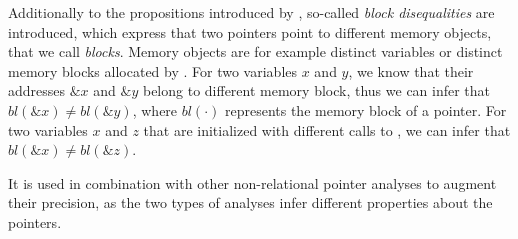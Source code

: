 Additionally to the propositions introduced by \textcite{2pointer}, so-called \emph{block disequalities}
are introduced, which express that two pointers point to different memory objects, that we call \emph{blocks}.
Memory objects are for example distinct variables or distinct memory blocks allocated by \malloc.
For two variables $x$ and $y$, we know that their addresses $\&x$ and $\&y$ belong to different memory block, thus we can infer that $bl(\&x) \neq bl(\&y)$, where $bl(\cdot)$ represents the memory block of a pointer.
For two variables $x$ and $z$ that are initialized with different calls to \malloc, we can infer that $bl(\&x) \neq bl(\&z)$.

It is used in combination with other non-relational pointer analyses to augment their precision,
as the two types of analyses infer different properties about the pointers.

